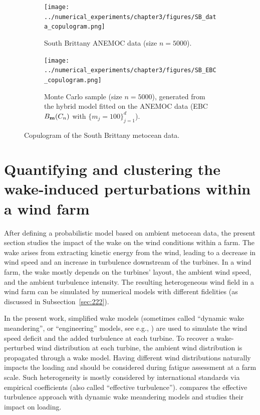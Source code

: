 \begin{landscape}
    \begin{figure}
        \begin{subfigure}[b]{0.49\linewidth}
            \centering
            \texttt{[image: ../numerical\_experiments/chapter3/figures/SB\_data\_copulogram.png]}
            \vspace*{2pt}
            \caption{South Brittany ANEMOC data (size $n=5000$).}
        \end{subfigure}
        \begin{subfigure}[b]{0.49\linewidth}
            \centering
            \texttt{[image: ../numerical\_experiments/chapter3/figures/SB\_EBC\_copulogram.png]}
            \caption{Monte Carlo sample (size $n=5000$), generated from the hybrid model fitted on the ANEMOC data (EBC $B_{{\bf m}}(C_n)$ with $ \{m_j=100\}_{j=1}^d$).}
        \end{subfigure}
        \vspace*{5pt} 
        \caption{Copulogram of the South Brittany metocean data.}
        \label{fig:sb_copulograms}
    \end{figure}
\end{landscape}






\section{Quantifying and clustering the wake-induced perturbations within a wind farm}\label{sec:wake_clust}
After defining a probabilistic model based on ambient metocean data, the present section studies the impact of the wake on the wind conditions within a farm. 
The wake arises from extracting kinetic energy from the wind, leading to a decrease in wind speed and an increase in turbulence downstream of the turbines. 
In a wind farm, the wake mostly depends on the turbines' layout, the ambient wind speed, and the ambient turbulence intensity. 
The resulting heterogeneous wind field in a wind farm can be simulated by numerical models with different fidelities (as discussed in Subsection~\ref{sec:222}). 

In the present work, simplified wake models (sometimes called ``dynamic wake meandering'', or ``engineering'' models, see e.g., \citealp{doubrawa_2020_benchmark}) are used to simulate the wind speed deficit and the added turbulence at each turbine. 
To recover a wake-perturbed wind distribution at each turbine, the ambient wind distribution is propagated through a wake model. 
Having different wind distributions naturally impacts the loading and should be considered during fatigue assessment at a farm scale. 
Such heterogeneity is mostly considered by international standards via empirical coefficients (also called ``effective turbulence''). 
\citet{doubrawa_2023} compares the effective turbulence approach with dynamic wake meandering models and studies their impact on loading. 

